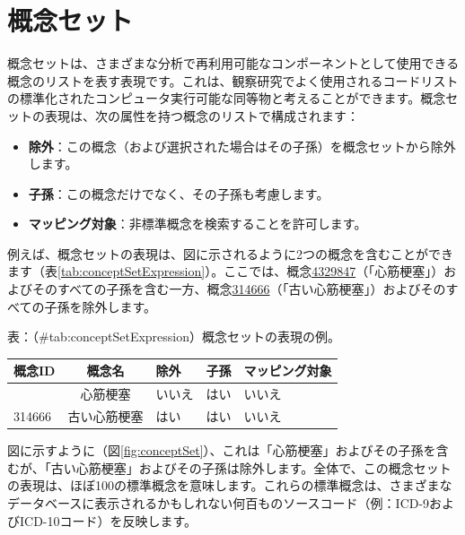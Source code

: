 \documentclass[
  11pt]{book}
\providecommand{\tightlist}{%
  \setlength{\itemsep}{0pt}\setlength{\parskip}{0pt}}
\theoremstyle{definition}
\theoremstyle{definition}
\theoremstyle{definition}
\theoremstyle{definition}
\theoremstyle{remark}
\begin{document}
\section{概念セット}\label{conceptSets}


概念セットは、さまざまな分析で再利用可能なコンポーネントとして使用できる概念のリストを表す表現です。これは、観察研究でよく使用されるコードリストの標準化されたコンピュータ実行可能な同等物と考えることができます。概念セットの表現は、次の属性を持つ概念のリストで構成されます：

\begin{itemize}
\tightlist
\item
  \textbf{除外}：この概念（および選択された場合はその子孫）を概念セットから除外します。
\item
  \textbf{子孫}：この概念だけでなく、その子孫も考慮します。
\item
  \textbf{マッピング対象}：非標準概念を検索することを許可します。
\end{itemize}

例えば、概念セットの表現は、図に示されるように2つの概念を含むことができます（表\ref{tab:conceptSetExpression}）。ここでは、概念\href{http://athena.ohdsi.org/search-terms/terms/4329847}{4329847}（「心筋梗塞」）およびそのすべての子孫を含む一方、概念\href{http://athena.ohdsi.org/search-terms/terms/314666}{314666}（「古い心筋梗塞」）およびそのすべての子孫を除外します。

表：（\#tab:conceptSetExpression）概念セットの表現の例。

\begin{longtable}[]{@{}lclll@{}}
\toprule\noalign{}
概念ID & 概念名 & 除外 & 子孫 & マッピング対象 \\
\midrule\noalign{}
\endhead
\bottomrule\noalign{}
\endlastfoot
4329847 & 心筋梗塞 & いいえ & はい & いいえ \\
314666 & 古い心筋梗塞 & はい & はい & いいえ \\
\end{longtable}

図に示すように（図\ref{fig:conceptSet}）、これは「心筋梗塞」およびその子孫を含むが、「古い心筋梗塞」およびその子孫は除外します。全体で、この概念セットの表現は、ほぼ100の標準概念を意味します。これらの標準概念は、さまざまなデータベースに表示されるかもしれない何百ものソースコード（例：ICD-9およびICD-10コード）を反映します。
\end{document}
